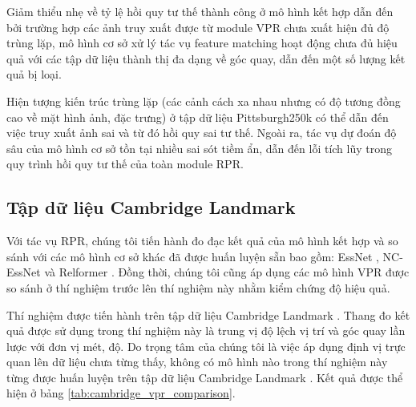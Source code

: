 Giảm thiểu nhẹ về tỷ lệ hồi quy tư thế thành công ở mô hình kết hợp dẫn đến bởi trường hợp các ảnh truy xuất được từ module VPR chưa xuất hiện đủ độ trùng lặp, mô hình cơ sở xử lý tác vụ feature matching hoạt động chưa đủ hiệu quả với các tập dữ liệu thành thị đa dạng về góc quay, dẫn đến một số lượng kết quả bị loại.

Hiện tượng kiến trúc trùng lặp (các cảnh cách xa nhau nhưng có độ tương đồng cao về mặt hình ảnh, đặc trưng) ở tập dữ liệu Pittsburgh250k \cite{6618963} có thể dẫn đến việc truy xuất ảnh sai và từ đó hồi quy sai tư thế. Ngoài ra, tác vụ dự đoán độ sâu của mô hình cơ sở tồn tại nhiều sai sót tiềm ẩn, dẫn đến lỗi tích lũy trong quy trình hồi quy tư thế của toàn module RPR.

\subsection*{Tập dữ liệu Cambridge Landmark}

Với tác vụ RPR, chúng tôi tiến hành đo đạc kết quả của mô hình kết hợp và so sánh với các mô hình cơ sở khác đã được huấn luyện sẵn bao gồm: EssNet \cite{zhou2020learn}, NC-EssNet \cite{zhou2020learn} và Relformer \cite{idan2023learning}. Đồng thời, chúng tôi cũng áp dụng các mô hình VPR được so sánh ở thí nghiệm trước lên thí nghiệm này nhằm kiểm chứng độ hiệu quả.

Thí nghiệm được tiến hành trên tập dữ liệu Cambridge Landmark \cite{kendall2016posenet}. Thang đo kết quả được sử dụng trong thí nghiệm này là trung vị độ lệch vị trí và góc quay lần lược với đơn vị mét, độ. Do trọng tâm của chúng tôi là việc áp dụng định vị trực quan lên dữ liệu chưa từng thấy, không có mô hình nào trong thí nghiệm này từng được huấn luyện trên tập dữ liệu Cambridge Landmark \cite{kendall2016posenet}. Kết quả được thể hiện ở bảng \ref{tab:cambridge_vpr_comparison}.


